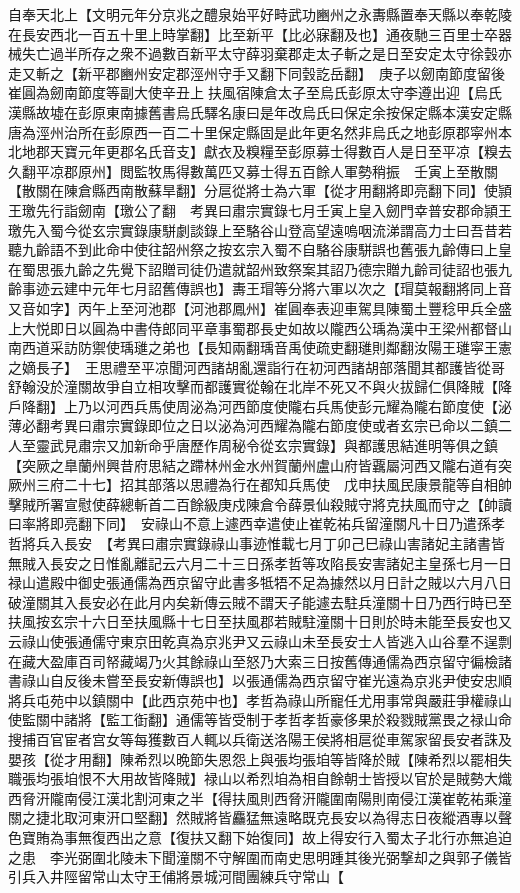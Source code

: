 自奉天北上【文明元年分京兆之醴泉始平好畤武功豳州之永夀縣置奉天縣以奉乾陵在長安西北一百五十里上時掌翻】比至新平【比必寐翻及也】通夜馳三百里士卒器械失亡過半所存之衆不過數百新平太守薛羽棄郡走太子斬之是日至安定太守徐瑴亦走又斬之【新平郡豳州安定郡涇州守手又翻下同瑴訖岳翻】　庚子以劒南節度留後崔圓為劒南節度等副大使辛丑上扶風宿陳倉太子至烏氏彭原太守李遵出迎【烏氏漢縣故墟在彭原東南據舊書烏氏驛名康曰是年改烏氏曰保定余按保定縣本漢安定縣唐為涇州治所在彭原西一百二十里保定縣固是此年更名然非烏氏之地彭原郡寜州本北地郡天寶元年更郡名氏音支】獻衣及糗糧至彭原募士得數百人是日至平凉【糗去久翻平凉郡原州】閲監牧馬得數萬匹又募士得五百餘人軍勢稍振　壬寅上至散關【散關在陳倉縣西南散蘇旱翻】分扈從將士為六軍【從才用翻將即亮翻下同】使頴王璬先行詣劒南【璬公了翻　考異曰肅宗實錄七月壬寅上皇入劒門幸普安郡命頴王璬先入蜀今從玄宗實錄康駢劇談錄上至駱谷山登高望遠嗚咽流涕謂高力士曰吾昔若聽九齡語不到此命中使往韶州祭之按玄宗入蜀不自駱谷康駢誤也舊張九齡傳曰上皇在蜀思張九齡之先覺下詔贈司徒仍遣就韶州致祭案其詔乃德宗贈九齡司徒詔也張九齡事迹云建中元年七月詔舊傳誤也】夀王瑁等分將六軍以次之【瑁莫報翻將同上音又音如字】丙午上至河池郡【河池郡鳳州】崔圓奉表迎車駕具陳蜀土豐稔甲兵全盛上大悦即日以圓為中書侍郎同平章事蜀郡長史如故以隴西公瑀為漢中王梁州都督山南西道采訪防禦使瑀璡之弟也【長知兩翻瑀音禹使疏吏翻璡則鄰翻汝陽王璡寜王憲之嫡長子】　王思禮至平凉聞河西諸胡亂還詣行在初河西諸胡部落聞其都護皆從哥舒翰没於潼關故爭自立相攻擊而都護實從翰在北岸不死又不與火拔歸仁俱降賊【降戶降翻】上乃以河西兵馬使周泌為河西節度使隴右兵馬使彭元耀為隴右節度使【泌薄必翻考異曰肅宗實錄即位之日以泌為河西耀為隴右節度使或者玄宗已命以二鎮二人至靈武見肅宗又加新命乎唐歷作周秘令從玄宗實錄】與都護思結進明等俱之鎮【突厥之臯蘭州興昔府思結之蹛林州金水州賀蘭州盧山府皆覊屬河西又隴右道有突厥州三府二十七】招其部落以思禮為行在都知兵馬使　戊申扶風民康景龍等自相帥擊賊所署宣慰使薛總斬首二百餘級庚戍陳倉令薛景仙殺賊守將克扶風而守之【帥讀曰率將即亮翻下同】　安祿山不意上遽西幸遣使止崔乾祐兵留潼關凡十日乃遣孫孝哲將兵入長安　【考異曰肅宗實錄祿山事迹惟載七月丁卯己巳祿山害諸妃主諸書皆無賊入長安之日惟亂離記云六月二十三日孫孝哲等攻陷長安害諸妃主皇孫七月一日禄山遣殿中御史張通儒為西京留守此書多牴牾不足為據然以月日計之賊以六月八日破潼關其入長安必在此月内矣新傳云賊不謂天子能遽去駐兵潼關十日乃西行時已至扶風按玄宗十六日至扶風縣十七日至扶風郡若賊駐潼關十日則於時未能至長安也又云祿山使張通儒守東京田乾真為京兆尹又云祿山未至長安士人皆逃入山谷羣不逞剽在藏大盈庫百司帑藏竭乃火其餘祿山至怒乃大索三日按舊傳通儒為西京留守徧檢諸書祿山自反後未嘗至長安新傳誤也】以張通儒為西京留守崔光遠為京兆尹使安忠順將兵屯苑中以鎮關中【此西京苑中也】孝哲為祿山所寵任尤用事常與嚴莊爭權祿山使監關中諸將【監工衘翻】通儒等皆受制于孝哲孝哲豪侈果於殺戮賊黨畏之禄山命搜捕百官宦者宫女等每獲數百人輒以兵衛送洛陽王侯將相扈從車駕家留長安者誅及嬰孩【從才用翻】陳希烈以晩節失恩怨上與張均張垍等皆降於賊【陳希烈以罷相失職張均張垍恨不大用故皆降賊】禄山以希烈垍為相自餘朝士皆授以官於是賊勢大熾西脅汧隴南侵江漢北割河東之半【得扶風則西脅汧隴圍南陽則南侵江漢崔乾祐乘潼關之捷北取河東汧口堅翻】然賊將皆麤猛無遠略既克長安以為得志日夜縱酒專以聲色寶賄為事無復西出之意【復扶又翻下始復同】故上得安行入蜀太子北行亦無追迫之患　李光弼圍北陵未下聞潼關不守解圍而南史思明踵其後光弼撃却之與郭子儀皆引兵入井陘留常山太守王俌將景城河間團練兵守常山【